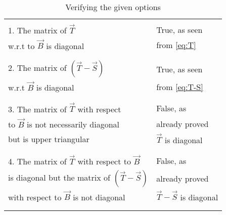 \documentclass[journal,12pt]{IEEEtran}
\begin{document}
\begin{longtable}{|l|l|}
    \hline
        & \\
        1. The matrix of $\vec{T}$ & True, as seen\\
        w.r.t to $\vec{B}$ is diagonal & from \eqref{eq:T}\\
        & \\
    \hline
        & \\
        2. The matrix of $(\vec{T}-\vec{S})$ & True, as seen\\
        w.r.t $\vec{B}$ is diagonal & from \eqref{eq:T-S}\\
        & \\
    \hline
        & \\
        3. The matrix of $\vec{T}$ with respect & False, as\\
        to $\vec{B}$ is not necessarily diagonal & already proved\\
        but is upper triangular & $\vec{T}$ is diagonal\\
        & \\
    \hline
        & \\
        4. The matrix of $\vec{T}$ with respect to $\vec{B}$ & False, as\\
        is diagonal but the matrix of $(\vec{T}-\vec{S})$ & already proved\\
        with respect to $\vec{B}$ is not diagonal & $\vec{T}-\vec{S}$ is diagonal\\
        & \\
    \hline
    \caption{Verifying the given options}
    \label{tab:proof}
\end{longtable}
\end{document}
